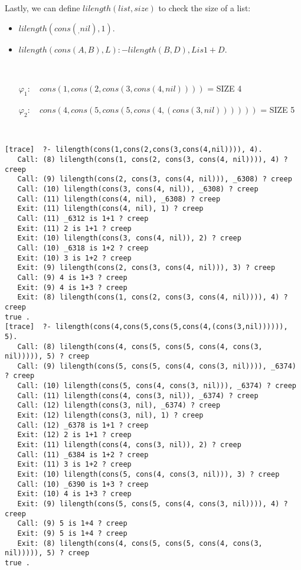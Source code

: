 \documentclass[fullpage]{article}
\begin{document}
Lastly, we can define $lilength(list,size)$ to check the size of a list:
\begin{itemize}
\item {\em $lilength(cons(_,nil),1).$}
\item {\em $lilength(cons(A,B), L):-lilength(B, D), L is 1+D.$}
\end{itemize}
 \
\begin{itemize}
\item[$\varphi_1$:]~ $cons(1,cons(2,cons(3,cons(4,nil))))$ = SIZE 4
\item[$\varphi_2$:]~ $cons(4,cons(5,cons(5,cons(4,(cons(3,nil))))))$ = SIZE 5
\end{itemize}
 \
\begin{verbatim}
[trace]  ?- lilength(cons(1,cons(2,cons(3,cons(4,nil)))), 4).
   Call: (8) lilength(cons(1, cons(2, cons(3, cons(4, nil)))), 4) ? creep
   Call: (9) lilength(cons(2, cons(3, cons(4, nil))), _6308) ? creep
   Call: (10) lilength(cons(3, cons(4, nil)), _6308) ? creep
   Call: (11) lilength(cons(4, nil), _6308) ? creep
   Exit: (11) lilength(cons(4, nil), 1) ? creep
   Call: (11) _6312 is 1+1 ? creep
   Exit: (11) 2 is 1+1 ? creep
   Exit: (10) lilength(cons(3, cons(4, nil)), 2) ? creep
   Call: (10) _6318 is 1+2 ? creep
   Exit: (10) 3 is 1+2 ? creep
   Exit: (9) lilength(cons(2, cons(3, cons(4, nil))), 3) ? creep
   Call: (9) 4 is 1+3 ? creep
   Exit: (9) 4 is 1+3 ? creep
   Exit: (8) lilength(cons(1, cons(2, cons(3, cons(4, nil)))), 4) ? creep
true .
[trace]  ?- lilength(cons(4,cons(5,cons(5,cons(4,(cons(3,nil)))))), 5).
   Call: (8) lilength(cons(4, cons(5, cons(5, cons(4, cons(3, nil))))), 5) ? creep
   Call: (9) lilength(cons(5, cons(5, cons(4, cons(3, nil)))), _6374) ? creep
   Call: (10) lilength(cons(5, cons(4, cons(3, nil))), _6374) ? creep
   Call: (11) lilength(cons(4, cons(3, nil)), _6374) ? creep
   Call: (12) lilength(cons(3, nil), _6374) ? creep
   Exit: (12) lilength(cons(3, nil), 1) ? creep
   Call: (12) _6378 is 1+1 ? creep
   Exit: (12) 2 is 1+1 ? creep
   Exit: (11) lilength(cons(4, cons(3, nil)), 2) ? creep
   Call: (11) _6384 is 1+2 ? creep
   Exit: (11) 3 is 1+2 ? creep
   Exit: (10) lilength(cons(5, cons(4, cons(3, nil))), 3) ? creep
   Call: (10) _6390 is 1+3 ? creep
   Exit: (10) 4 is 1+3 ? creep
   Exit: (9) lilength(cons(5, cons(5, cons(4, cons(3, nil)))), 4) ? creep
   Call: (9) 5 is 1+4 ? creep
   Exit: (9) 5 is 1+4 ? creep
   Exit: (8) lilength(cons(4, cons(5, cons(5, cons(4, cons(3, nil))))), 5) ? creep
true .
\end{verbatim}
\end{document}
